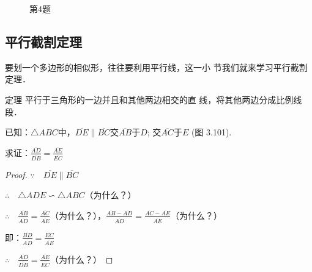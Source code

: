 \begin{figure}[htp]
    \centering
{}
    \caption*{第4题}
\end{figure}

\subsection{平行截割定理}
要划一个多边形的相似形，往往要利用平行线，这一小
节我们就来学习平行截割定理．

\begin{blk}
    {定理} 平行于三角形的一边并且和其他两边相交的直
线，将其他两边分成比例线段．
\end{blk}

已知：$\triangle ABC$中，$\overline{DE}\parallel \overline{BC}$交$\overline{AB}$于$D$; 交$\overline{AC}$于$E$ (图
3.101).

求证：$\frac{\overline{AD}}{\overline{DB}}=\frac{\overline{AE}}{\overline{EC}}$

\begin{proof}
$\because\quad  \overline{DE}\parallel \overline{BC}$

$\therefore\quad \triangle ADE\backsim \triangle ABC$（为什么？）

$\therefore\quad \frac{\overline{AB}}{\overline{AD}}=\frac{\overline{AC}}{\overline{AE}}$（为什么？），\quad $\frac{\overline{AB}-\overline{AD}}{\overline{AD}}=\frac{\overline{AC}-\overline{AE}}{\overline{AE}}$（为什么？）

即：$\frac{\overline{BD}}{\overline{AD}}=\frac{\overline{EC}}{\overline{AE}}$

$\therefore\quad \frac{\overline{AD}}{\overline{DB}}=\frac{\overline{AE}}{\overline{EC}}$（为什么？）
\end{proof}

